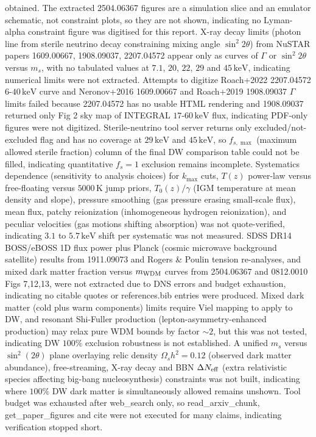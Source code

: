 \documentclass[11pt,a4paper]{article}
\begin{document}
obtained. The extracted 2504.06367 figures are a simulation slice and an emulator schematic, not constraint plots, so they are not shown, indicating no Lyman-alpha constraint figure was digitised for this report. X-ray decay limits (photon line from sterile neutrino decay constraining mixing angle $\sin^2 2\theta$) from NuSTAR papers 1609.00667, 1908.09037, 2207.04572 appear only as curves of $\Gamma$ or $\sin^2 2\theta$ versus $m_s$, with no tabulated values at $7.1$, $20$, $22$, $29$ and $45\,\mathrm{keV}$, indicating numerical limits were not extracted. Attempts to digitize Roach+2022 2207.04572 $6$-$40\,\mathrm{keV}$ curve and Neronov+2016 1609.00667 and Roach+2019 1908.09037 $\Gamma$ limits failed because 2207.04572 has no usable HTML rendering and 1908.09037 returned only Fig 2 sky map of INTEGRAL $17$-$60\,\mathrm{keV}$ flux, indicating PDF-only figures were not digitized. Sterile-neutrino tool server returns only excluded/not-excluded flag and has no coverage at $29\,\mathrm{keV}$ and $45\,\mathrm{keV}$, so $f_{s,\max}$ (maximum allowed sterile fraction) column of the final DW comparison table could not be filled, indicating quantitative $f_s=1$ exclusion remains incomplete. Systematics dependence (sensitivity to analysis choices) for $k_{\max}$ cuts, $T(z)$ power-law versus free-floating versus $5000\,\mathrm{K}$ jump priors, $T_0(z)/\gamma$ (IGM temperature at mean density and slope), pressure smoothing (gas pressure erasing small-scale flux), mean flux, patchy reionization (inhomogeneous hydrogen reionization), and peculiar velocities (gas motions shifting absorption) was not quote-verified, indicating $3.1$ to $5.7\,\mathrm{keV}$ shift per systematic was not measured. SDSS DR14 BOSS/eBOSS 1D flux power plus Planck (cosmic microwave background satellite) results from 1911.09073 and Rogers \& Poulin tension re-analyses, and mixed dark matter fraction versus $m_{\rm WDM}$ curves from 2504.06367 and 0812.0010 Figs 7,12,13, were not extracted due to DNS errors and budget exhaustion, indicating no citable quotes or references.bib entries were produced. Mixed dark matter (cold plus warm components) limits require Viel mapping to apply to DW, and resonant Shi-Fuller production (lepton-asymmetry-enhanced production) may relax pure WDM bounds by factor $\sim 2$, but this was not tested, indicating DW $100\%$ exclusion robustness is not established. A unified $m_s$ versus $\sin^2(2\theta)$ plane overlaying relic density $\Omega_s h^2 = 0.12$ (observed dark matter abundance), free-streaming, X-ray decay and BBN $\Delta N_{\rm eff}$ (extra relativistic species affecting big-bang nucleosynthesis) constraints was not built, indicating where $100\%$ DW dark matter is simultaneously allowed remains unshown. Tool budget was exhausted after web\_search only, so read\_arxiv\_chunk, get\_paper\_figures and cite were not executed for many claims, indicating verification stopped short.
\end{document}
